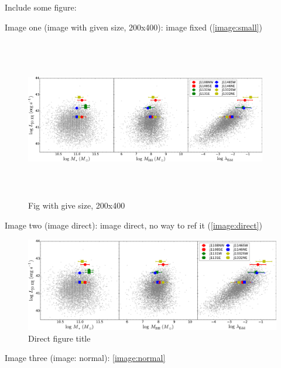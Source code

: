 


Include some figure:

Image one (image with given size, 200x400): image fixed (\autoref{image:small})

\begin{figure}[htbp]
\centering
\includegraphics[width=300pt,height=200pt]{../_demoResources/figs/zhihu/comp_dr7.pdf}
\caption{Fig with give size, 200x400}
\label{image:fixed}
\end{figure}

Image two (image direct): image direct, no way to ref it (\autoref{image:direct})

\begin{figure}[htbp]
\centering
\includegraphics[keepaspectratio,width=\textwidth,height=0.75\textheight]{../_demoResources/figs/zhihu/comp_dr7.pdf}
\caption{Direct figure title}
\end{figure}

Image three (image: normal): \autoref{image:normal}

